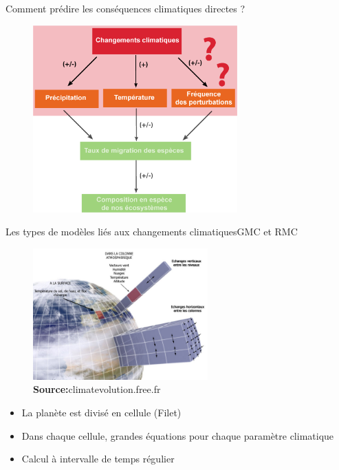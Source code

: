 \documentclass{eecslides}
\begin{document}
	\begin{frame}[t]{Comment prédire les conséquences climatiques directes ?}

		\begin{figure}
			\vspace{-0.5cm}
			\includegraphics[width=0.7\textwidth]{CCscheme2.png} 
		\end{figure}    
	
	\end{frame}



	\begin{frame}{Les types de modèles liés aux changements climatiques}{GMC et RMC}
	    	\vspace{-0.5cm}
		\begin{figure}
			\includegraphics[width=0.6\textwidth]{mod2.jpg}
	         		\caption*{\scriptsize\textbf{Source:}climatevolution.free.fr} 
		\end{figure}
		\vspace{-0.5cm}
		\begin{itemize}
 			\item La planète est divisé en cellule (Filet)
 			\item Dans chaque cellule, grandes équations pour chaque paramètre climatique
 			\item Calcul à intervalle de temps régulier
 		\end{itemize}
	
	\end{frame}
\end{document}
